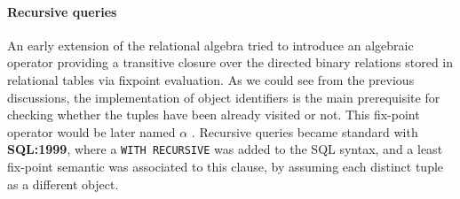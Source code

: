 \paragraph*{Recursive queries}
An early extension of the relational algebra \cite{AhoAlpha} tried to introduce an algebraic operator providing a transitive closure over the directed binary relations stored in relational tables via fixpoint evaluation. As we could see from the previous discussions, the implementation of object identifiers is the main prerequisite for checking whether the tuples have been already visited or not. This fix-point operator would be later named $\alpha$ \cite{Alpha}. Recursive queries became standard with  \textbf{SQL:1999}, where a \texttt{WITH RECURSIVE} was added to the SQL syntax, and a least fix-point semantic was associated to this clause, by assuming each distinct tuple as a different object.

